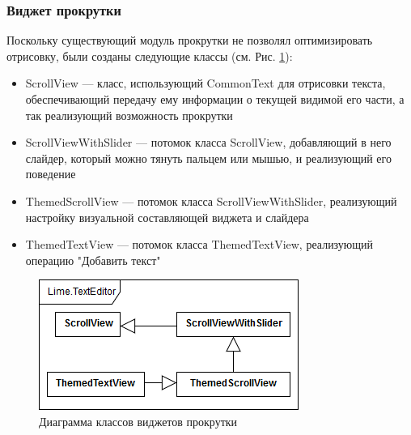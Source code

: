 \documentclass{fefu}
\begin{document}
			\subsubsection{Виджет прокрутки}
				\par Поскольку существующий модуль прокрутки не позволял оптимизировать
				отрисовку, были созданы следующие классы (см. Рис. \ref{diag:ScrollView}):
				\begin{itemize}
					\item ScrollView --- класс, использующий CommonText для отрисовки текста,
					обеспечивающий передачу ему информации о текущей видимой его части, а так
					реализующий возможность прокрутки
					\item ScrollViewWithSlider --- потомок класса ScrollView, добавляющий в 
					него слайдер, который можно тянуть пальцем или мышью, и реализующий его
					поведение
					\item ThemedScrollView --- потомок класса ScrollViewWithSlider,
					реализующий настройку визуальной составляющей виджета и слайдера
					\item ThemedTextView --- потомок класса ThemedTextView, реализующий 
					операцию "Добавить текст"
				\end{itemize}
				\begin{figure}[H]
					\centering
					\includegraphics[width=0.5\linewidth]{diagrams/ScrollView.png}
					\caption{Диаграмма классов виджетов прокрутки}
					\label{diag:ScrollView}
				\end{figure}
\end{document}
